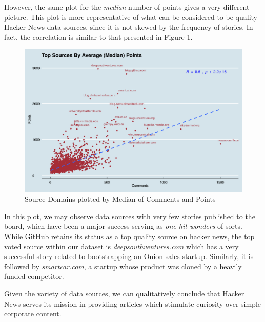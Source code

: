 \documentclass[11pt,journal,final,a4paper]{IEEEtran}
\begin{document}
However, the same plot for the \textit{median} number of points gives a very different picture. This plot is more representative of what can be considered to be quality Hacker News data sources, since it is not skewed by the frequency of stories. In fact, the correlation is similar to that presented in Figure 1.
\begin{figure}[!ht]
\centerline{\includegraphics[scale=0.4]{img/descriptive_05_source_med.png}}
\caption{Source Domains plotted by Median of Comments and Points}
\label{fig5}
\end{figure}
In this plot, we may observe data sources with very few stories published to the board, which have been a major success serving as \textit{one hit wonders} of sorts. While GitHub retains its status as a top quality source on hacker news, the top voted source within our dataset is \textit{deepsouthventures.com} which has a very successful story related to bootstrapping an Onion sales startup. Similarly, it is followed by \textit{smartcar.com}, a startup whose product was cloned by a heavily funded competitor. 

Given the variety of data sources, we can qualitatively conclude that Hacker News serves its mission in providing articles which stimulate curiosity over simple corporate content.
\end{document}
